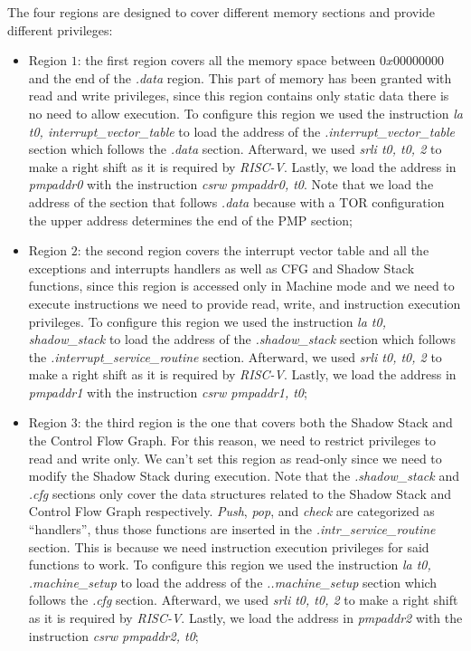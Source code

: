 The four regions are designed to cover different memory sections and provide different
privileges:
\begin{itemize}
  \item Region $1$: the first region covers all the memory space between
    $0x00000000$ and the end of the \textit{.data} region. This part of memory
    has been granted with read and write privileges, since this region contains only
    static data there is no need to allow execution. To configure this region we
    used the instruction \textit{la t0, interrupt\_vector\_table} to load the address
    of the \textit{.interrupt\_vector\_table} section which follows the \textit{.data}
    section. Afterward, we used \textit{srli t0, t0, 2} to make a right shift as
    it is required by \textit{RISC-V}. Lastly, we load the address in \textit{pmpaddr0}
    with the instruction \textit{csrw pmpaddr0, t0}. Note that we load the
    address of the section that follows \textit{.data} because with a TOR configuration
    the upper address determines the end of the PMP section;

  \item Region $2$: the second region covers the interrupt vector table and all
    the exceptions and interrupts handlers as well as CFG and Shadow Stack
    functions, since this region is accessed only in Machine mode and we need to
    execute instructions we need to provide read, write, and instruction execution
    privileges. To configure this region we used the instruction \textit{la t0, shadow\_stack}
    to load the address of the \textit{.shadow\_stack} section which follows the
    \textit{.interrupt\_service\_routine} section. Afterward, we used \textit{srli
    t0, t0, 2} to make a right shift as it is required by \textit{RISC-V}.
    Lastly, we load the address in \textit{pmpaddr1} with the instruction
    \textit{csrw pmpaddr1, t0};

  \item Region $3$: the third region is the one that covers both the Shadow
    Stack and the Control Flow Graph. For this reason, we need to restrict
    privileges to read and write only. We can't set this region as read-only since
    we need to modify the Shadow Stack during execution. Note that the \textit{.shadow\_stack}
    and \textit{.cfg} sections only cover the data structures related to the
    Shadow Stack and Control Flow Graph respectively. \textit{Push}, \textit{pop},
    and \textit{check} are categorized as ``handlers'', thus those functions are
    inserted in the \textit{.intr\_service\_routine} section. This is because we
    need instruction execution privileges for said functions to work. To
    configure this region we used the instruction \textit{la t0, .machine\_setup}
    to load the address of the \textit{..machine\_setup} section which follows
    the \textit{.cfg} section. Afterward, we used \textit{srli t0, t0, 2} to
    make a right shift as it is required by \textit{RISC-V}. Lastly, we load the
    address in \textit{pmpaddr2} with the instruction \textit{csrw pmpaddr2, t0};


\end{itemize}
